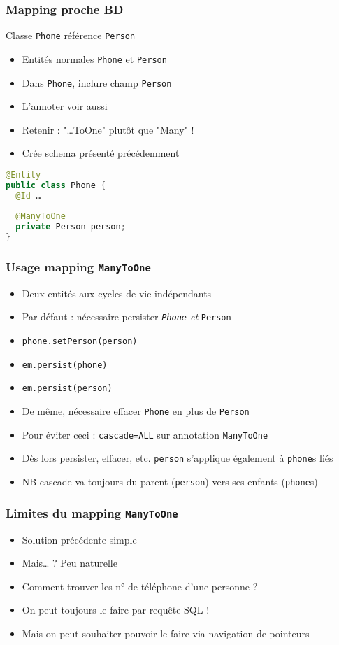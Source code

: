 \documentclass[english, french]{beamer}
\begin{document}
\begin{frame}[fragile]
	\frametitle{Mapping proche BD}
	Classe \texttt{Phone} référence \texttt{Person}
	\begin{itemize}
		\item Entités normales \texttt{Phone} et \texttt{Person}
		\item Dans \texttt{Phone}, inclure champ \texttt{Person}
		\item L’annoter  {\tiny voir aussi }
		\item Retenir : "…ToOne" plutôt que "Many" !
		 \item Crée schema présenté précédemment
	\end{itemize}
	\begin{lstlisting}[language=Java]
@Entity
public class Phone {
  @Id …
  
  @ManyToOne
  private Person person;
}
	\end{lstlisting}
\end{frame}

\begin{frame}
	\frametitle{Usage mapping \texttt{ManyToOne}}
	\begin{itemize}
		\item Deux entités aux cycles de vie indépendants
		\item Par défaut : nécessaire persister \emph{\texttt{Phone} et} \texttt{Person}
		\item \texttt{phone.setPerson(person)}
		\item \texttt{em.persist(phone)}
		\item \texttt{em.persist(person)}
		\item De même, nécessaire effacer \texttt{Phone} en plus de \texttt{Person}
		\item Pour éviter ceci : \texttt{cascade=ALL} sur annotation \texttt{ManyToOne}
		\item Dès lors persister, effacer, etc. \texttt{person} s’applique également à \texttt{phone}s liés
		\item NB cascade va toujours du parent (\texttt{person}) vers ses enfants (\texttt{phone}s)
	\end{itemize}
\end{frame}

\begin{frame}
	\frametitle{Limites du mapping \texttt{ManyToOne}}
	\begin{itemize}
		\item Solution précédente simple
		\item Mais… ? \pause Peu naturelle \pause
		\item Comment trouver les n° de téléphone d’une personne ? \pause
		\item On peut toujours le faire par requête SQL !
		\item Mais on peut souhaiter pouvoir le faire via navigation de pointeurs
	\end{itemize}
\end{frame}
\end{document}

